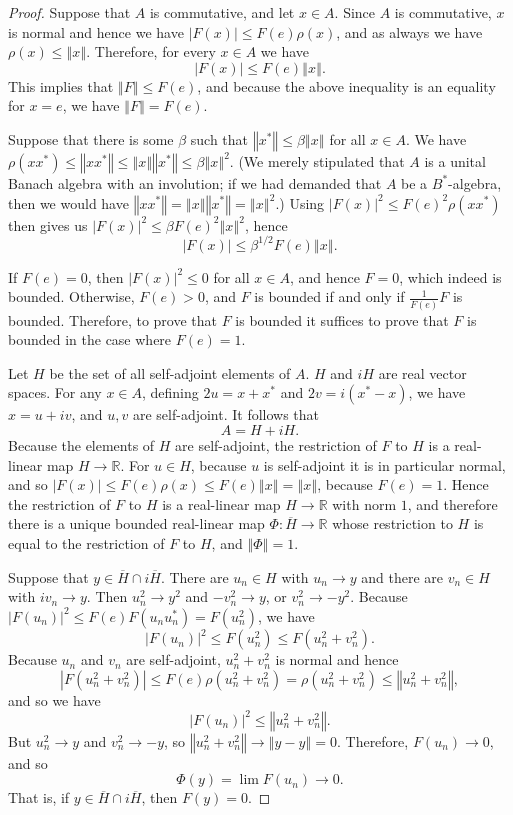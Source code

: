 \documentclass{article}
\newcommand{\norm}[1]{\left\Vert #1 \right\Vert}
\theoremstyle{definition}
\begin{document}
\begin{proof}
Suppose that $A$ is commutative, and let $x \in A$. Since $A$ is commutative, $x$ is normal and hence
we have $|F(x)| \leq F(e) \rho(x)$, and as always we have $\rho(x) \leq \norm{x}$.
Therefore, for every $x \in A$ we have
\[
|F(x)| \leq F(e) \norm{x}.
\]
This implies that $\norm{F} \leq F(e)$, and because the above inequality is an equality for $x=e$, we have
$\norm{F}=F(e)$. 

Suppose that there is some $\beta$ such that $\norm{x^*} \leq \beta \norm{x}$ for all $x \in A$. We have
$\rho(xx^*) \leq \norm{xx^*} \leq  \norm{x} \norm{x^*} \leq \beta \norm{x}^2$. (We merely stipulated that $A$ is a  unital Banach algebra
with an involution; if we had demanded that $A$ be a $B^*$-algebra, then we would have $\norm{xx^*}=\norm{x}\norm{x^*}=\norm{x}^2$.)
Using $|F(x)|^2 \leq F(e)^2 \rho(xx^*)$ then gives us $|F(x)|^2 \leq \beta F(e)^2 \norm{x}^2$, hence
\[
|F(x)| \leq \beta^{1/2} F(e) \norm{x}.
\]

If $F(e)=0$, then $|F(x)|^2 \leq 0$ for all $x \in A$, and hence $F=0$, which indeed is bounded.
Otherwise, $F(e)>0$, and $F$ is bounded if and only if $\frac{1}{F(e)}F$ is bounded.
Therefore, to prove that $F$ is bounded it suffices to prove that $F$ is bounded in the case where
$F(e)=1$.

Let $H$ be the set of all self-adjoint elements of $A$. $H$ and $iH$ are real vector spaces.
For any $x \in A$, defining $2u=x+x^*$ and $2v=i(x^*-x)$, we have $x=u+iv$, and $u,v$ are self-adjoint. It follows that
\[
A=H+iH.
\]
Because the elements
of $H$ are self-adjoint, the restriction of $F$ to $H$ is a real-linear map $H \to \mathbb{R}$.
For $u \in H$, because $u$ is self-adjoint it is in particular normal, and so $|F(x)| \leq F(e) \rho(x) \leq F(e) \norm{x} = \norm{x}$, because $F(e)=1$.  Hence
the restriction of $F$ to $H$ is a real-linear map $H \to \mathbb{R}$ with norm $1$, and therefore there is a unique bounded real-linear map $\Phi:\overline{H} \to \mathbb{R}$ whose restriction to $H$ is equal to the restriction of $F$ to $H$, and $\norm{\Phi}=1$.

Suppose that $y \in \overline{H} \cap i\overline{H}$. There are $u_n \in H$ with $u_n \to y$ and there are $v_n \in H$ with
$iv_n \to y$. Then $u_n^2 \to y^2$ and $-v_n^2 \to y$, or $v_n^2 \to -y^2$. Because $|F(u_n)|^2 \leq F(e)F(u_nu_n^*)=
F(u_n^2)$, we have 
\[
|F(u_n)|^2 \leq F(u_n^2) \leq F(u_n^2+v_n^2).
\]
Because $u_n$ and $v_n$ are self-adjoint, $u_n^2+v_n^2$ is normal and hence
\[
|F(u_n^2+v_n^2)| \leq F(e)\rho(u_n^2+v_n^2) = \rho(u_n^2+v_n^2) \leq \norm{u_n^2+v_n^2},
\]
and so we have
\[
|F(u_n)|^2 \leq \norm{u_n^2+v_n^2}.
\]
But $u_n^2 \to y$ and $v_n^2 \to -y$, so $\norm{u_n^2+v_n^2} \to \norm{y-y}=0$. Therefore, $F(u_n) \to 0$, and so
\[
\Phi(y) = \lim F(u_n) \to 0.
\]
That is, if $y \in \overline{H} \cap i\overline{H}$, then $F(y)=0$.


\end{proof}
\end{document}
